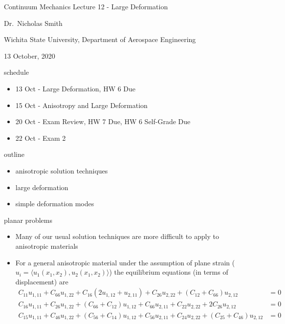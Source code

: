 \documentclass[
  letterpaper,
  ignorenonframetext,
  aspectratio=43,
  handout,
  12pt]{beamer}
\author{}
\date{}
\providecommand{\tightlist}{%
  \setlength{\itemsep}{0pt}\setlength{\parskip}{0pt}}
\providecommand{\tightlist}{%
\setlength{\itemsep}{0pt}\setlength{\parskip}{0pt}}
\begin{document}
\begin{frame}{Continuum Mechanics}
\protect\hypertarget{continuum-mechanics}{}
Lecture 12 - Large Deformation

Dr.~Nicholas Smith

Wichita State University, Department of Aerospace Engineering

13 October, 2020
\end{frame}

\begin{frame}{schedule}
\protect\hypertarget{schedule}{}
\begin{itemize}
\tightlist
\item
  13 Oct - Large Deformation, HW 6 Due
\item
  15 Oct - Anisotropy and Large Deformation
\item
  20 Oct - Exam Review, HW 7 Due, HW 6 Self-Grade Due
\item
  22 Oct - Exam 2
\end{itemize}
\end{frame}

\begin{frame}{outline}
\protect\hypertarget{outline}{}
\begin{itemize}
\tightlist
\item
  anisotropic solution techniques
\item
  large deformation
\item
  simple deformation modes
\end{itemize}
\end{frame}

\begin{frame}{planar problems}
\protect\hypertarget{planar-problems}{}
\begin{itemize}
\tightlist
\item
  Many of our usual solution techniques are more difficult to apply to
  anisotropic materials
\item
  For a general anisotropic material under the assumption of plane
  strain (\(u_i = \langle u_1(x_1,x_2), u_2(x_1,x_2)\rangle\)) the
  equilibrium equations (in terms of displacement) are \[\begin{aligned}
    C_{11} u_{1,11} + C_{66} u_{1,22} + C_{16} (2u_{1,12} + u_{2,11}) + C_{26} u_{2,22} + (C_{12}+C_{66})u_{2,12} &=0\\
    C_{16} u_{1,11} + C_{26} u_{1,22} + (C_{66} + C_{12}) u_{1,12} + C_{66} u_{2,11} + C_{22}u_{2,22} + 2C_{26}u_{2,12} &=0\\
    C_{15} u_{1,11} + C_{46} u_{1,22} + (C_{56} + C_{14})u_{1,12} + C_{56}u_{2,11} + C_{24} u_{2,22} + (C_{25}+C_{46})u_{2,12} &=0
  \end{aligned}\]
\end{itemize}
\end{frame}
\end{document}
